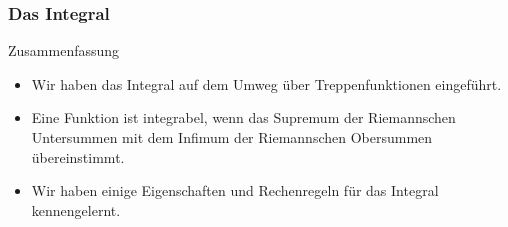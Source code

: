 \documentclass{beamer}
\newcommand{\ue}{\"u}
\newcommand{\mytitle}{Das Integral}
\begin{document}
\begin{frame}\frametitle{\mytitle}
	\begin{block}{Zusammenfassung}
	\begin{itemize}
	\item Wir haben das Integral auf dem Umweg \ue ber Treppenfunktionen eingef\ue hrt.
	\item Eine Funktion ist integrabel, wenn das Supremum der Riemannschen Untersummen mit dem Infimum der Riemannschen Obersummen \ue bereinstimmt.
	\item Wir haben einige Eigenschaften und Rechenregeln f\ue r das Integral kennengelernt.
	\end{itemize}
	\end{block}
\end{frame}
\end{document}

